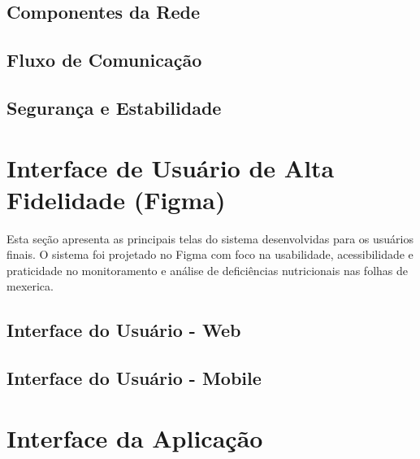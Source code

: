\documentclass[
    a4paper,
    12pt,
    english,
    brazilian
]{article}
\begin{document}
    \subsection{\textbf{Componentes da Rede}}
    \label{sect:Componentes-da-Rede}
    

    \subsection{\textbf{Fluxo de Comunicação}}
    \label{sect:Fluxo-de-comunicacao}
    

    \subsection{\textbf{Segurança e Estabilidade}}
    \label{sect:Seguranca-e-estabilidade}
    

\section{Interface de Usuário de Alta Fidelidade (Figma)}
Esta seção apresenta as principais telas do sistema desenvolvidas para os usuários
finais. O sistema foi projetado no Figma com foco na usabilidade, acessibilidade e praticidade no
monitoramento e análise de deficiências nutricionais nas folhas de mexerica.
\medskip    

    \subsection{\textbf{Interface do Usuário - Web}}
    \label{sect:Interface-Web}
    

    \subsection{\textbf{Interface do Usuário - Mobile}}
    \label{sect:Interface-Mobile}
    

\section{Interface da Aplicação}
\medskip
    \label{sect:Interface-Aplicacao}
    
    
\end{document}
